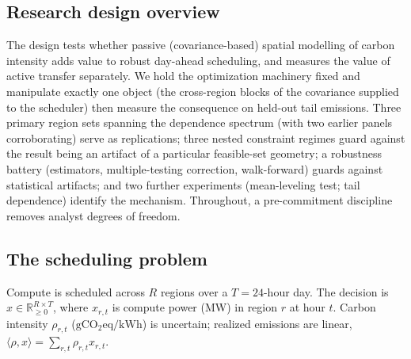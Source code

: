 \documentclass[12pt]{article}
\newcommand{\R}{\mathbb{R}}
\newcommand{\gco}{\mathrm{gCO_2eq/kWh}}
\begin{document}
\subsection{Research design overview}
The design tests whether passive (covariance-based) spatial modelling of carbon
intensity adds value to robust day-ahead scheduling, and measures the value of active
transfer separately. We hold the optimization
machinery fixed and manipulate exactly one object (the cross-region blocks of the
covariance supplied to the scheduler) then measure the consequence on held-out
tail emissions. Three primary region sets spanning the dependence spectrum (with two
earlier panels corroborating) serve as replications; three nested constraint regimes
guard against the result being an
artifact of a particular feasible-set geometry; a robustness battery (estimators,
multiple-testing correction, walk-forward) guards against statistical artifacts; and
two further experiments (mean-leveling test; tail dependence) identify the mechanism.
Throughout, a pre-commitment discipline removes analyst degrees of freedom.

\subsection{The scheduling problem}
Compute is scheduled across $R$ regions over a $T=24$-hour day. The decision is
$x\in\R^{R\times T}_{\ge0}$, where $x_{r,t}$ is compute power (MW) in region $r$ at
hour $t$. Carbon intensity $\rho_{r,t}$ ($\gco$) is uncertain; realized emissions
are linear, $\langle\rho,x\rangle=\sum_{r,t}\rho_{r,t}x_{r,t}$.
\end{document}
